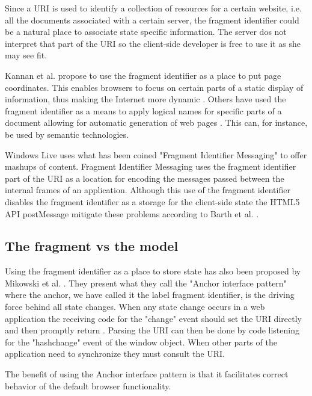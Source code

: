 \documentclass[english]{ifimaster}
\begin{document}
 



Since a URI is used to identify a collection of resources for a certain website, i.e. all the documents associated with a certain server, the fragment identifier could be a natural place to associate state specific information. The server dos not interpret that part of the URI so the client-side developer is free to use it as she may see fit. 

Kannan et al. propose to use the fragment identifier as a place to put page coordinates. This enables browsers to focus on certain parts of a static display of information, thus making the Internet more dynamic \parencite{Kannan:2006:LUB:1135777.1135924}. Others have used the fragment identifier as a means to apply logical names for specific parts of a document allowing for automatic generation of web pages \parencite{Aimar199599}. This can, for instance, be used by semantic technologies. 

Windows Live uses what has been coined "Fragment Identifier Messaging" to offer mashups of content. Fragment Identifier Messaging uses the fragment identifier part of the URI as a location for encoding the messages passed between the internal frames of an application. Although this use of the fragment identifier disables the fragment identifier as a storage for the client-side state the HTML5 API postMessage mitigate these problems according to Barth et al. \parencite{barth}.

\subsection{The fragment vs the model}
\label{sec:uriAnchorBackground}
Using the fragment identifier as a place to store state has also been proposed by Mikowski et al. \parencite{mikowski}. They present what they call the "Anchor interface pattern" where the anchor, we have called it the label fragment identifier, is the driving force behind all state changes. When any state change occurs in a web application the receiving code for the "change" event should set the URI directly and then promptly return \parencite[p.85-88]{mikowski}. Parsing the URI can then be done by code listening for the "hashchange" event of the window object. When other parts of the application need to synchronize they must consult the URI. 

The benefit of using the Anchor interface pattern is that it facilitates correct behavior of the default browser functionality.
\end{document}
